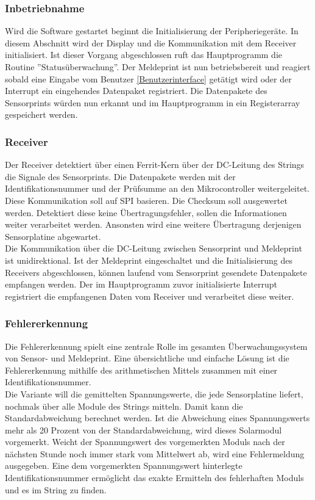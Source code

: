 \subsubsection{Inbetriebnahme}
Wird die Software gestartet beginnt die Initialisierung der Peripheriegeräte. In diesem Abschnitt wird der Display und die Kommunikation mit dem Receiver initialisiert. Ist dieser Vorgang abgeschlossen ruft das Hauptprogramm die Routine ''Statusüberwachung''. Der Meldeprint ist nun betriebsbereit und reagiert sobald eine Eingabe vom Benutzer \ref{Benutzerinterface} getätigt wird oder der Interrupt ein eingehendes Datenpaket registriert. Die Datenpakete des Sensorprints würden nun erkannt und im Hauptprogramm in ein Registerarray gespeichert werden.

\subsubsection{Receiver}
Der Receiver detektiert über einen Ferrit-Kern über der DC-Leitung des Strings die Signale des Sensorprints. Die Datenpakete werden mit der Identifikationsnummer und der Prüfsumme an den Mikrocontroller weitergeleitet. Diese Kommunikation soll auf SPI basieren. Die Checksum soll ausgewertet werden. Detektiert diese keine Übertragungsfehler, sollen die Informationen weiter verarbeitet werden. Ansonsten wird eine weitere Übertragung derjenigen Sensorplatine abgewartet. \\
Die Kommunikation über die DC-Leitung zwischen Sensorprint und Meldeprint ist unidirektional. Ist der Meldeprint eingeschaltet und die Initialisierung des Receivers abgeschlossen, können laufend vom Sensorprint gesendete Datenpakete empfangen werden. Der im Hauptprogramm zuvor initialisierte Interrupt registriert die empfangenen Daten vom Receiver und verarbeitet diese weiter.

\subsubsection{Fehlererkennung}
Die Fehlererkennung spielt eine zentrale Rolle im gesamten Überwachungssystem von Sensor- und Meldeprint. Eine übersichtliche und einfache Lösung ist die Fehlererkennung mithilfe des arithmetischen Mittels zusammen mit einer Identifikationsnummer.\\
Die Variante will die gemittelten Spannungswerte, die jede Sensorplatine liefert, nochmals über alle Module des Strings mitteln. Damit kann die Standardabweichung berechnet werden. Ist die Abweichung eines Spannungswerts mehr als 20 Prozent von der Standardabweichung, wird dieses Solarmodul vorgemerkt. Weicht der Spannungswert des vorgemerkten Moduls nach der nächsten Stunde noch immer stark vom Mittelwert ab, wird eine Fehlermeldung ausgegeben. Eine dem vorgemerkten Spannungswert hinterlegte Identifikationsnummer ermöglicht das exakte Ermitteln des fehlerhaften Moduls und es im String zu finden.

